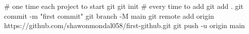 # one time each project to start git
git init
# every time to add 
git add .
git commit -m "first commit"
git branch -M main
git remote add origin https://github.com/shawonmondal058/first-github.git
git push -u origin main